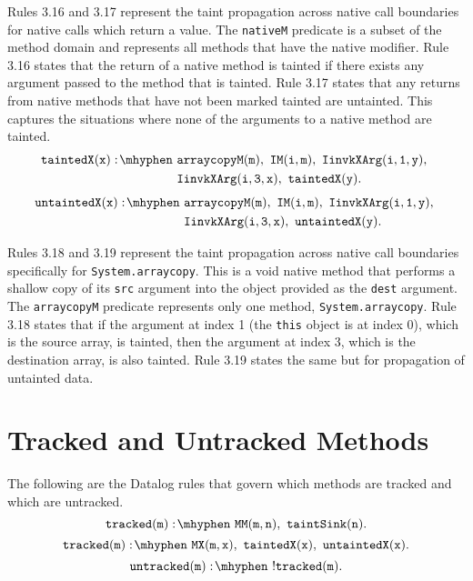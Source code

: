 Rules 3.16 and 3.17 represent the taint propagation across native call
boundaries for native calls which return a value. The \texttt{nativeM}
predicate is a subset of the method domain and represents all methods
that have the native modifier. Rule 3.16 states that the return of a
native method is tainted if there exists any argument passed to the
method that is tainted. Rule 3.17 states that any returns from native
methods that have not been marked tainted are untainted. This captures
the situations where none of the arguments to a native method are
tainted.
\begin{equation}
  \begin{split}
    \mathtt{taintedX(x) \is} & \mathtt{arraycopyM(m) \also IM(i,m)
      \also IinvkXArg(i,1,y) \also} \\ & \mathtt{IinvkXArg(i,3,x)
      \also taintedX(y).} \\
  \end{split}
\end{equation}
\begin{equation}
  \begin{split}
    \mathtt{untaintedX(x) \is} & \mathtt{arraycopyM(m) \also IM(i,m)
      \also IinvkXArg(i,1,y) \also} \\ & \mathtt{IinvkXArg(i,3,x)
      \also untaintedX(y).} \\
  \end{split}
\end{equation}

Rules 3.18 and 3.19 represent the taint propagation across native call
boundaries specifically for \texttt{System.arraycopy}. This is a void
native method that performs a shallow copy of its \texttt{src}
argument into the object provided as the \texttt{dest} argument. The
\texttt{arraycopyM} predicate represents only one method,
\texttt{System.arraycopy}. Rule 3.18 states that if the argument at
index 1 (the \texttt{this} object is at index 0), which is the source
array, is tainted, then the argument at index 3, which is the
destination array, is also tainted. Rule 3.19 states the same but for
propagation of untainted data.
\section{Tracked and Untracked Methods}
The following are the Datalog rules that govern which methods are
tracked and which are untracked.
\begin{equation}
  \mathtt{tracked(m) \is MM(m,n) \also taintSink(n).}
\end{equation}
\begin{equation}
  \mathtt{tracked(m) \is MX(m,x) \also taintedX(x) \also
    untaintedX(x).}
\end{equation}
\begin{equation}
  \mathtt{untracked(m) \is !tracked(m).}
\end{equation}



